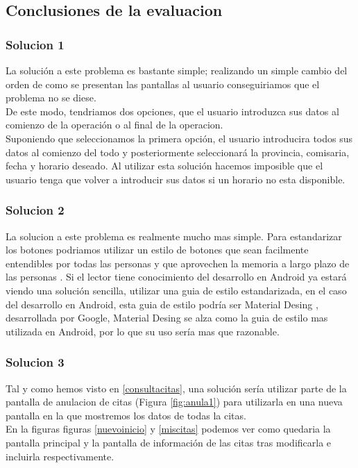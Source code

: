\documentclass[a4paper,11pt]{article}
\begin{document}
\subsection{Conclusiones de la evaluacion}
\subsubsection{Solucion 1}\label{solucion1}
La solución a este problema es bastante simple; realizando un simple cambio del orden de como se presentan las pantallas al usuario conseguiriamos que el problema no se diese.\\
De este modo, tendriamos dos opciones, que el usuario introduzca sus datos al comienzo de la operación o al final de la operacion. \\
Suponiendo que seleccionamos la primera opción, el usuario introducira todos sus datos al comienzo del todo y posteriormente seleccionará la provincia, comisaria, fecha y horario deseado. Al utilizar esta solución hacemos imposible que el usuario tenga que volver a introducir sus datos si un horario no esta disponible.

\subsubsection{Solucion 2}\label{solucion2}
La solucion a este problema es realmente mucho mas simple. Para estandarizar los botones podriamos utilizar un estilo de botones que sean facilmente entendibles por todas las personas y que aprovechen la memoria a largo plazo de las personas \cite{diapTema2}. Si el lector tiene conocimiento del desarrollo en Android ya estará viendo una solución sencilla, utilizar una guia de estilo estandarizada, en el caso del desarrollo en Android, esta guia de estilo podría ser Material Desing \cite{materialdesing}, desarrollada por Google, Material Desing se alza como la guia de estilo mas utilizada en Android, por lo que su uso sería mas que razonable.

\subsubsection{Solucion 3}
Tal y como hemos visto en \ref{consultacitas}, una solución sería utilizar parte de la pantalla de anulacion de citas (Figura \ref{fig:anula1}) para utilizarla en una nueva pantalla en la que mostremos los datos de todas la citas.\\
En la figuras figuras \ref{nuevoinicio} y \ref{miscitas} podemos ver como quedaria la pantalla principal y la pantalla de información de las citas tras modificarla e incluirla respectivamente.
\end{document}
